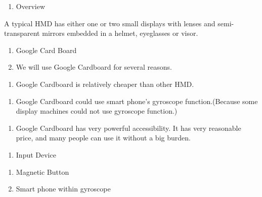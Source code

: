 \documentclass{article}
\begin{document}
\noindent \textit{}

\begin{enumerate}
\item \textit{ }Overview 
\end{enumerate}

\noindent  A typical HMD has either one or two small displays with lenses and semi-transparent mirrors embedded in a helmet, eyeglasses or visor.

\noindent 

\begin{enumerate}
\item   Google Card Board

\item  We will use Google Cardboard for several reasons.
\end{enumerate}

\noindent 

\begin{enumerate}
\item  Google Cardboard is relatively cheaper than other HMD.
\end{enumerate}

\noindent 

\begin{enumerate}
\item  Google Cardboard could use smart phone's gyroscope function.(Because some display machines could not use gyroscope function.)
\end{enumerate}

\noindent 

\begin{enumerate}
\item  Google Cardboard has very powerful accessibility. It has very reasonable price, and many people can use it without a big burden.
\end{enumerate}

\noindent 

\begin{enumerate}
\item  Input Device
\end{enumerate}

\noindent 

\begin{enumerate}
\item  Magnetic Button

\item  Smart phone within gyroscope
\end{enumerate}
\end{document}
